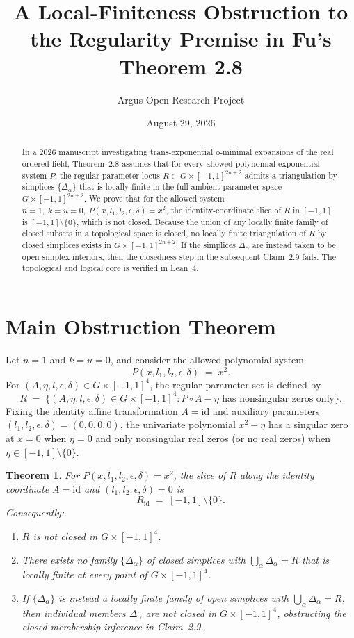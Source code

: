 \documentclass[10pt,reqno]{amsart}
\title[Regularity-Premise Obstruction in Fu's Theorem 2.8]
{A Local-Finiteness Obstruction to the Regularity Premise in Fu's Theorem 2.8}
\author{Argus Open Research Project}
\date{August 29, 2026}
\newtheorem{theorem}{Theorem}[section]
\theoremstyle{definition}
\begin{document}
\begin{abstract}
In a 2026 manuscript investigating trans-exponential o-minimal expansions of the real ordered field, Theorem~2.8 assumes that for every allowed polynomial-exponential system $P$, the regular parameter locus $R\subset G\times[-1,1]^{2n+2}$ admits a triangulation by simplices $\{\Delta_\alpha\}$ that is locally finite in the full ambient parameter space $G\times[-1,1]^{2n+2}$. We prove that for the allowed system $n=1,\ k=u=0,\ P(x,l_1,l_2,\epsilon,\delta)=x^2$, the identity-coordinate slice of $R$ in $[-1,1]$ is $[-1,1]\setminus\{0\}$, which is not closed. Because the union of any locally finite family of closed subsets in a topological space is closed, no locally finite triangulation of $R$ by closed simplices exists in $G\times[-1,1]^{2n+2}$. If the simplices $\Delta_\alpha$ are instead taken to be open simplex interiors, then the closedness step in the subsequent Claim~2.9 fails. The topological and logical core is verified in Lean~4.
\end{abstract}

\maketitle

\section{Main Obstruction Theorem}

Let $n=1$ and $k=u=0$, and consider the allowed polynomial system
\[
  P(x,l_1,l_2,\epsilon,\delta) \;=\; x^2.
\]
For $(A,\eta,l,\epsilon,\delta)\in G\times[-1,1]^4$, the regular parameter set is defined by
\[
  R \;=\; \bigl\{(A,\eta,l,\epsilon,\delta)\in G\times[-1,1]^4 : P\circ A - \eta\text{ has nonsingular zeros only}\bigr\}.
\]
Fixing the identity affine transformation $A=\mathrm{id}$ and auxiliary parameters $(l_1,l_2,\epsilon,\delta)=(0,0,0,0)$, the univariate polynomial $x^2-\eta$ has a singular zero at $x=0$ when $\eta=0$ and only nonsingular real zeros (or no real zeros) when $\eta\in[-1,1]\setminus\{0\}$.

\begin{theorem}\label{thm:main}
For $P(x,l_1,l_2,\epsilon,\delta)=x^2$, the slice of $R$ along the identity coordinate $A=\mathrm{id}$ and $(l_1,l_2,\epsilon,\delta)=0$ is
\[
  R_{\mathrm{id}} \;=\; [-1,1]\setminus\{0\}.
\]
Consequently:
\begin{enumerate}[label=\textup{(\arabic*)}]
  \item $R$ is not closed in $G\times[-1,1]^4$.
  \item There exists no family $\{\Delta_\alpha\}$ of closed simplices with $\bigcup_\alpha\Delta_\alpha = R$ that is locally finite at every point of $G\times[-1,1]^4$.
  \item If $\{\Delta_\alpha\}$ is instead a locally finite family of open simplices with $\bigcup_\alpha\Delta_\alpha = R$, then individual members $\Delta_\alpha$ are not closed in $G\times[-1,1]^4$, obstructing the closed-membership inference in Claim~2.9.
\end{enumerate}
\end{theorem}
\end{document}
